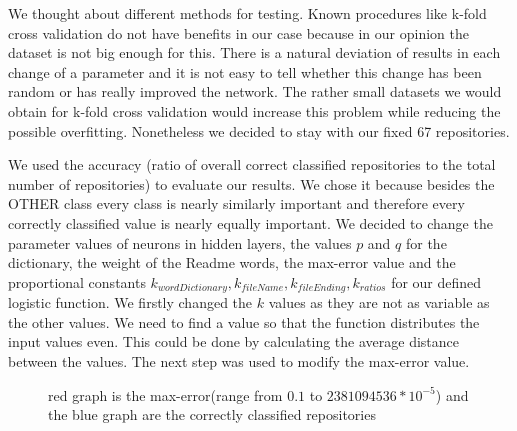 \documentclass[paper=A4,pagesize=auto,12pt,headinclude=true,footinclude=true,BCOR=0mm,DIV=calc]{scrartcl}
\begin{document}
	
	 We thought about different methods for testing. Known procedures like k-fold cross validation do not have benefits in our case because in our opinion the dataset is not big enough for this. There is a natural deviation of results in each change of a parameter and it is not easy to tell whether this change has been random or has really improved the network. The rather small datasets we would obtain for k-fold cross validation would increase this problem while reducing the possible overfitting. Nonetheless we decided to stay with our fixed 67 repositories.
	 
	We used the accuracy (ratio of overall correct classified repositories to the total number of repositories) to evaluate our results. We chose it because besides the OTHER class every class is nearly similarly important and therefore every correctly classified value is nearly equally important.
	We decided to change the parameter values of neurons in hidden layers, the values $p$ and $q$ for the dictionary, the weight of the Readme words, the max-error value and the proportional constants $k_{wordDictionary}, k_{fileName}, k_{fileEnding}, k_{ratios}$ for our defined logistic function.
	We firstly changed the $k$ values as they are not as variable as the other values. We need to find a value so that the function distributes the input values even. This could be done by calculating the average distance between the values.
	The next step was used to modify the max-error value.
		\begin{figure}[H]
			\caption{red graph is the max-error(range from $0.1$ to $2381094536 * 10^{-5}$) and the blue graph are the correctly classified repositories}
		\end{figure}
		
\end{document}
